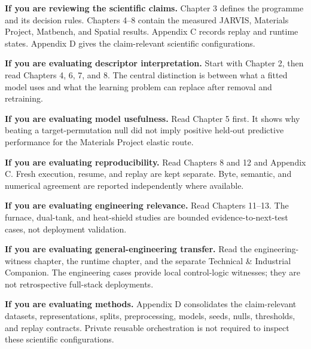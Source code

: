 \documentclass[11pt,a4paper,oneside]{report}
\begin{document}
\textbf{If you are reviewing the scientific claims.} Chapter 3 defines the programme and its decision rules. Chapters 4--8 contain the measured JARVIS, Materials Project, Matbench, and Spatial results. Appendix C records replay and runtime states. Appendix D gives the claim-relevant scientific configurations.

\textbf{If you are evaluating descriptor interpretation.} Start with Chapter 2, then read Chapters 4, 6, 7, and 8. The central distinction is between what a fitted model uses and what the learning problem can replace after removal and retraining.

\textbf{If you are evaluating model usefulness.} Read Chapter 5 first. It shows why beating a target-permutation null did not imply positive held-out predictive performance for the Materials Project elastic route.

\textbf{If you are evaluating reproducibility.} Read Chapters 8 and 12 and Appendix C. Fresh execution, resume, and replay are kept separate. Byte, semantic, and numerical agreement are reported independently where available.

\textbf{If you are evaluating engineering relevance.} Read Chapters 11--13. The furnace, dual-tank, and heat-shield studies are bounded evidence-to-next-test cases, not deployment validation.

\textbf{If you are evaluating general-engineering transfer.} Read the engineering-witness chapter, the runtime chapter, and the separate Technical \& Industrial Companion. The engineering cases provide local control-logic witnesses; they are not retrospective full-stack deployments.

\textbf{If you are evaluating methods.} Appendix D consolidates the claim-relevant datasets, representations, splits, preprocessing, models, seeds, nulls, thresholds, and replay contracts. Private reusable orchestration is not required to inspect these scientific configurations.

\begin{center}
\end{center}

\tableofcontents
\clearpage
\listoffigures
\clearpage
\listoftables
\clearpage
\end{document}
